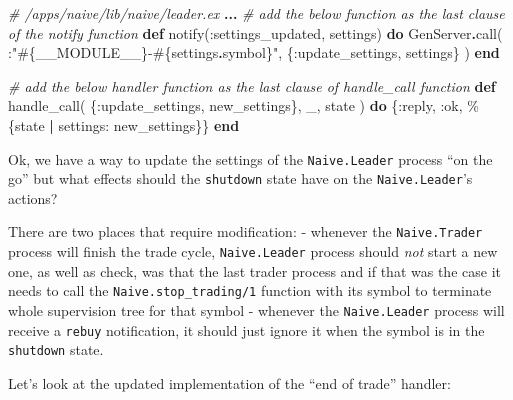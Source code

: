 \documentclass[
]{book}
\newenvironment{Shaded}{\begin{snugshade}}{\end{snugshade}}
\newcommand{\CommentTok}[1]{\textcolor[rgb]{0.56,0.35,0.01}{\textit{#1}}}
\newcommand{\ConstantTok}[1]{\textcolor[rgb]{0.00,0.00,0.00}{#1}}
\newcommand{\KeywordTok}[1]{\textcolor[rgb]{0.13,0.29,0.53}{\textbf{#1}}}
\newcommand{\NormalTok}[1]{#1}
\newcommand{\OperatorTok}[1]{\textcolor[rgb]{0.81,0.36,0.00}{\textbf{#1}}}
\newcommand{\OtherTok}[1]{\textcolor[rgb]{0.56,0.35,0.01}{#1}}
\newcommand{\StringTok}[1]{\textcolor[rgb]{0.31,0.60,0.02}{#1}}
\newcommand{\VariableTok}[1]{\textcolor[rgb]{0.00,0.00,0.00}{#1}}
\begin{document}
\begin{Shaded}
\begin{Highlighting}[]
\CommentTok{\# /apps/naive/lib/naive/leader.ex}
  \OperatorTok{...}
  \CommentTok{\# add the below function as the last clause of the \textasciigrave{}notify\textasciigrave{} function}
  \KeywordTok{def}\NormalTok{ notify(}\VariableTok{:settings\_updated}\NormalTok{, settings) }\KeywordTok{do}
    \ConstantTok{GenServer}\OperatorTok{.}\NormalTok{call(}
\NormalTok{      :}\StringTok{"}\OtherTok{\#\{}\ConstantTok{\_\_MODULE\_\_}\OtherTok{\}}\StringTok{{-}}\OtherTok{\#\{}\NormalTok{settings}\OperatorTok{.}\NormalTok{symbol}\OtherTok{\}}\StringTok{"}\NormalTok{,}
\NormalTok{      \{}\VariableTok{:update\_settings}\NormalTok{, settings\}}
\NormalTok{    )}
  \KeywordTok{end}

  \CommentTok{\# add the below handler function as the last clause of \textasciigrave{}handle\_call\textasciigrave{} function}
  \KeywordTok{def}\NormalTok{ handle\_call(}
\NormalTok{        \{}\VariableTok{:update\_settings}\NormalTok{, new\_settings\},}
\NormalTok{        \_,}
\NormalTok{        state}
\NormalTok{      ) }\KeywordTok{do}
\NormalTok{    \{}\VariableTok{:reply}\NormalTok{, }\VariableTok{:ok}\NormalTok{, \%\{state }\OperatorTok{|} \VariableTok{settings:}\NormalTok{ new\_settings\}\}}
  \KeywordTok{end}
\end{Highlighting}
\end{Shaded}

Ok, we have a way to update the settings of the \texttt{Naive.Leader} process ``on the go'' but what effects should the \texttt{shutdown} state have on the \texttt{Naive.Leader}'s actions?

There are two places that require modification:
- whenever the \texttt{Naive.Trader} process will finish the trade cycle, \texttt{Naive.Leader} process should \emph{not} start a new one, as well as check, was that the last trader process and if that was the case it needs to call the \texttt{Naive.stop\_trading/1} function with its symbol to terminate whole supervision tree for that symbol
- whenever the \texttt{Naive.Leader} process will receive a \texttt{rebuy} notification, it should just ignore it when the symbol is in the \texttt{shutdown} state.

Let's look at the updated implementation of the ``end of trade'' handler:
\end{document}
